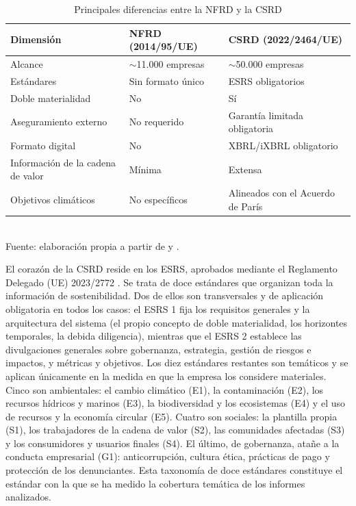 \begin{table}[H]
\centering
\caption{Principales diferencias entre la NFRD y la CSRD}
\label{tab:nfrd-csrd}
\begin{tabular}{lll}
\toprule
\textbf{Dimensión} & \textbf{NFRD (2014/95/UE)} & \textbf{CSRD (2022/2464/UE)} \\
\midrule
Alcance & $\sim$11.000 empresas & $\sim$50.000 empresas \\
Estándares & Sin formato único & ESRS obligatorios \\
Doble materialidad & No & Sí \\
Aseguramiento externo & No requerido & Garantía limitada obligatoria \\
Formato digital & No & XBRL/iXBRL obligatorio \\
Información de la cadena de valor & Mínima & Extensa \\
Objetivos climáticos & No específicos & Alineados con el Acuerdo de París \\
\bottomrule
\end{tabular}
\\[4pt]
{\footnotesize Fuente: elaboración propia a partir de \textcite{nfrd2014} y \textcite{csrd2022}.}
\end{table}

El corazón de la CSRD reside en los ESRS, aprobados mediante el Reglamento Delegado
(UE) 2023/2772 \parencite{esrs2023}. Se trata de doce estándares que organizan toda la
información de sostenibilidad. Dos de ellos son transversales y de aplicación obligatoria en
todos los casos: el ESRS 1 fija los requisitos generales y la arquitectura del sistema
(el propio concepto de doble materialidad, los horizontes temporales, la debida diligencia),
mientras que el ESRS 2 establece las divulgaciones generales sobre gobernanza, estrategia,
gestión de riesgos e impactos, y métricas y objetivos. Los diez estándares restantes son
temáticos y se aplican únicamente en la medida en que la empresa los considere materiales.
Cinco son ambientales: el cambio climático (E1), la contaminación (E2), los recursos hídricos y marinos
(E3), la biodiversidad y los ecosistemas (E4) y el uso de recursos y la economía circular
(E5). Cuatro son sociales: la plantilla propia (S1), los trabajadores de la cadena de valor (S2), las
comunidades afectadas (S3) y los consumidores y usuarios finales (S4). El último, de
gobernanza, atañe a la conducta empresarial (G1): anticorrupción, cultura ética, prácticas de
pago y protección de los denunciantes. Esta taxonomía de doce estándares constituye el estándar 
con la que se ha medido la cobertura temática de los informes analizados.

